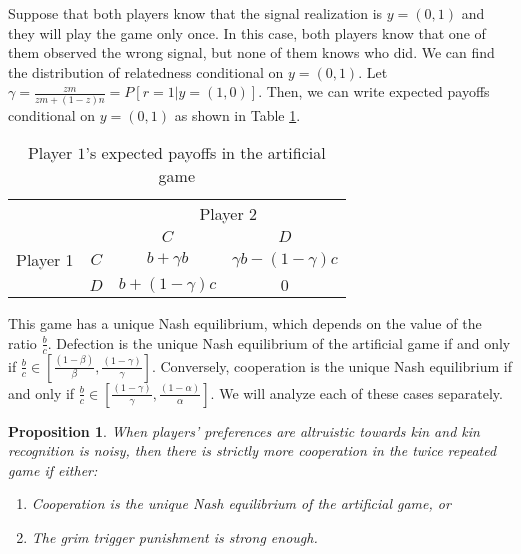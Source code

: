 \documentclass[12pt]{article}
\newtheorem{proposition}{Proposition}
\begin{document}
Suppose that both players know that the signal realization is $y=(0,1)$ and they will play the game only once. In this case, both players know that one  of them observed the wrong signal, but none of them knows who did. We can find the distribution of relatedness conditional on $y=(0,1)$. Let $\gamma=\frac{zm}{zm+(1-z)n}=P[r=1|y=(1,0)]$. Then, we can write expected payoffs conditional on $y=(0,1)$ as shown in Table \ref{table:artificial}.

\begin{table}[h]
\center
\caption{Player $1$'s expected payoffs in the artificial game} \vspace{1ex} 
\begin{tabular}{cc|c|c|}
\multicolumn{2}{c}{}  & \multicolumn{2}{c}{\small Player 2} \\
& \multicolumn{1}{c}{} & \multicolumn{1}{c}{$C$} & \multicolumn{1}{c}{$D$} \\
\cline{3-4} {\small Player 1} & $C$ & $b+\gamma b$ & $\gamma b-(1- \gamma)c$\\
\cline{3-4} & $D$& $b+(1-\gamma)c$ & $0$ \\
\cline{3-4}
\end{tabular}
\label{table:artificial}
\end{table}

This game has a unique Nash equilibrium, which depends on the value of the ratio $\frac{b}{c}$. Defection is the unique Nash equilibrium of the artificial game if and only if $\frac{b}{c} \in [\frac{(1- \beta)}{\beta}, \frac{(1-\gamma)}{\gamma}]$. Conversely, cooperation is the unique Nash equilibrium if and only if $\frac{b}{c} \in [\frac{(1- \gamma)}{\gamma}, \frac{(1- \alpha)}{\alpha}]$. We will analyze each of these cases separately.


\begin{proposition}
When players' preferences are altruistic towards kin and kin recognition is noisy, then there is strictly more cooperation in the twice repeated game if either:
\singlespace

\vspace{-1ex}
\begin{enumerate}
\item[i.]{Cooperation is the unique Nash equilibrium of the artificial game, or}
\item[ii.]{The grim trigger punishment is strong enough.}
\end{enumerate}
\end{proposition}
\doublespace
\end{document}
